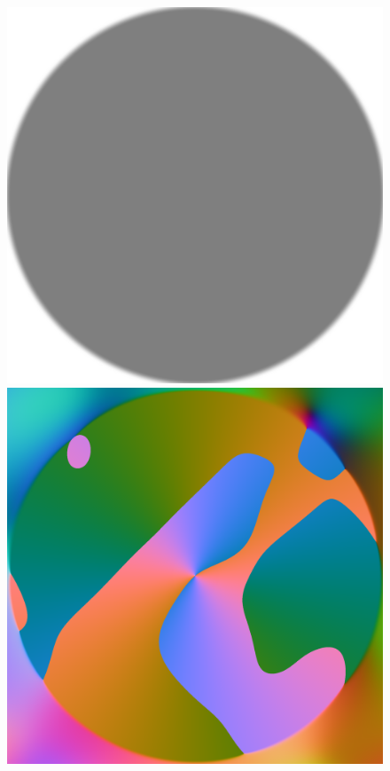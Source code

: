 \documentclass[a4paper]{article}
\begin{document}
\begin{figure}[H]
\begin{minipage}[]{0.19\textwidth}
\end{minipage}
\begin{minipage}[]{0.19\textwidth}
\includegraphics[width=\textwidth]{share/Alpha.png}
\end{minipage}
\begin{minipage}[]{0.19\textwidth}
\includegraphics[width=\textwidth]{share/Potential.png}

\end{minipage}
\end{figure}
\end{document}
